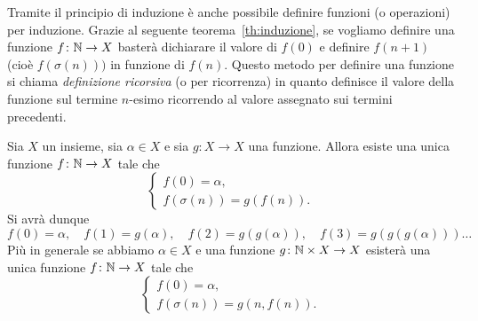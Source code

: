 Tramite il principio di induzione è anche possibile 
definire funzioni (o operazioni) per induzione.
Grazie al seguente teorema~\ref{th:induzione}, 
se vogliamo definire una funzione $f\colon{\mathbb N}\to X$
basterà dichiarare il valore di $f(0)$ e definire $f(n+1)$ 
(cioè $f(\sigma(n)))$ in funzione di $f(n)$.
Questo metodo per definire una funzione si chiama 
\emph{definizione ricorsiva} (o per ricorrenza) in quanto definisce 
il valore della funzione sul termine $n$-esimo ricorrendo
al valore assegnato sui termini precedenti.

\begin{theorem}
  \label{th:induzione}%
  Sia $X$ un insieme, sia $\alpha\in X$ e sia $g\colon X\to X$ una funzione.
  Allora esiste una unica funzione $f\colon {\mathbb N} \to X$ tale che
  \begin{equation}\label{eq:4835628}
    \begin{cases}
      f(0) = \alpha, \\
      f(\sigma(n)) = g(f(n)).
    \end{cases}
  \end{equation}
  Si avrà dunque
  \[
    f(0) = \alpha,\quad
    f(1) = g(\alpha),\quad
    f(2) = g(g(\alpha)),\quad
    f(3) = g(g(g(\alpha)))\dots
  \]
  Più in generale se abbiamo $\alpha\in X$ e una funzione $g\colon {\mathbb N} \times X \to X$
  esisterà una unica funzione $f\colon {\mathbb N} \to X$ tale che
  \begin{equation}
    \begin{cases}
      f(0) = \alpha, \\
      f(\sigma(n)) = g(n, f(n)).
    \end{cases}
  \end{equation}
\end{theorem}
%
